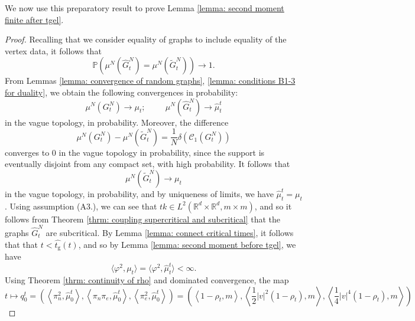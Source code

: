 We now use this preparatory result to prove Lemma \ref{lemma: second moment finite after tgel}. \begin{proof} Recalling that we consider equality of graphs to include equality of the vertex data, it follows that \begin{equation} \mathbb{P}(\mu^N(\widehat{G}^N_t)=\mu^N(\widetilde{G}^N_t))\rightarrow 1. \end{equation}  From Lemmas \ref{lemma: convergence of random graphs}, \ref{lemma: conditions B1-3 for duality}, we obtain the following convergences in probability:
\begin{equation}
    \mu^N(G^N_{t})\rightarrow {\mu}_{t};\hspace{1cm}
    \mu^N(\widehat{G}^N_{t})\rightarrow \widehat{\mu}^t_{t}
\end{equation} in the vague topology, in probability.  Moreover, the difference \begin{equation}
    \mu^N(G^N_{t})-\mu^N(\widetilde{G}^N_{t})=\frac{1}{N}\delta(\mathcal{C}_1(G^N_{t}))
\end{equation} converges to $0$ in the vague topology in probability, since the support is eventually disjoint from any compact set, with high probability. It follows that \begin{equation}
    \mu^N(\widetilde{G}^N_{t})\rightarrow \mu_{t}
\end{equation} in the vague topology, in probability, and by uniqueness of limits, we have $\widehat{\mu}^t_{t}=\mu_{t}$. Using assumption ({A3.}), we can see that $t k\in L^2(\mathbb{R}^d\times \mathbb{R}^d,m\times m)$, and so it follows from Theorem \ref{thrm: coupling supercritical and subcritical} that the graphs $\widehat{G}^N_{t}$ are subcritical. By Lemma \ref{lemma: connect critical times}, it follows that that  $t<\widehat{t_\mathrm{g}}(t)$, and so by Lemma \ref{lemma: second moment before tgel}, we have \begin{equation}
   \langle \varphi^2, \mu_t\rangle = \langle \varphi^2, \widehat{\mu}^t_{t}\rangle <\infty.
\end{equation} Using Theorem \ref{thrm: continuity of rho} and dominated convergence, the map \begin{equation}
    t\mapsto q^t_0=\left(\left\langle \pi_n^2, \widehat{\mu}^t_0\right\rangle,\left\langle \pi_n\pi_e, \widehat{\mu}^t_0\right\rangle,\left\langle \pi_e^2, \widehat{\mu}^t_0\right\rangle\right)=\left(\left\langle 1-\rho_t,m\right\rangle,\left\langle \frac{1}{2}|v|^2(1-\rho_t),m\right\rangle,\left\langle \frac{1}{4}|v|^4(1-\rho_t),m\right\rangle\right)

\end{equation}
\end{proof}
